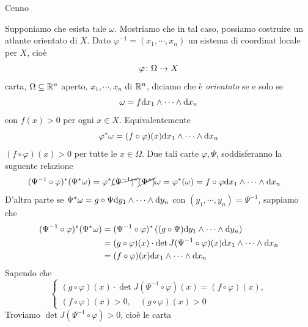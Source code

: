 \documentclass[a4paper]{article}
\begin{document}
\begin{snippetproof}{Cenno}
    \begin{ffiproof}
        \item Supponiamo che esista tale \(\omega\).
        Mostriamo che in tal caso, possiamo costruire un atlante orientato di \(X\).
        Dato \(\varphi^{-1}=(x_1, \cdots, x_n)\)
        un sistema di coordinat locale per \(X\), cioè \[
            \varphi \colon \Omega \to X
        \]
        carta, \(\Omega \subseteq \mathbb{R}^n\) aperto, \(x_1, \cdots, x_n\)
        di \(\mathbb{R}^n\), diciamo che è \emph{orientato}
        se e solo se \[
            \omega = f\text dx_1 \wedge \cdots \wedge \text dx_n
        \]
        con \(f(x) > 0\) per ogni \(x \in X\).
        Equivalentemente
        \[
            \varphi^\ast \omega = (f \circ \varphi)(x) \text dx_1 \wedge \cdots \wedge \text dx_n 
        \]
        \((f \circ \varphi)(x) > 0\) per tutte le \(x \in \Omega\).
        Due tali carte \(\varphi, \Psi\), soddisferanno la suguente relazione
        \begin{align*}
            (\Psi^{-1} \circ \varphi)^\ast (\Psi^\ast \omega)
            &= \varphi^\ast \cancel{(\Psi^{-1})^\ast}
            \cancel{(\Psi^\ast)} \omega = \varphi^\ast(\omega)= f \circ \varphi \text dx_1 \wedge \cdots \wedge \text dx_n 
        \end{align*}
        D'altra parte se \(\Psi^\ast\omega = g \circ \Psi \text dy_1 \wedge \cdots \wedge \text dy_n\)
        con \((y_1, \cdots, y_n) = \Psi^{-1}\), sappiamo che
        \begin{align*}
            (\Psi^{-1} \circ \varphi)^\ast (\Psi^\ast \omega)
            &= (\Psi^{-1} \circ \varphi)^\ast \left((g \circ \Psi) \text dy_1 \wedge \cdots \wedge \text dy_n\right) \\
            &= (g \circ \varphi)(x) \cdot \det J(\Psi^{-1} \circ \varphi)(x) \text dx_1 \wedge \cdots \wedge \text dx_n  \\
            &= (f \circ \varphi)(x) \text dx_1 \wedge \cdots \wedge \text dx_n
        \end{align*}
        Sapendo che \[
            \begin{cases}
                (g \circ \varphi)(x) \cdot \det J(\Psi^{-1} \circ \varphi)(x) = (f \circ \varphi)(x),\\
                (f \circ \varphi)(x)>0,\quad (g \circ \varphi)(x)>0
            \end{cases}
        \]
        Troviamo \(\det J(\Psi^{-1} \circ \varphi) > 0\), cioè le carta

\end{ffiproof}
\end{snippetproof}
\end{document}
